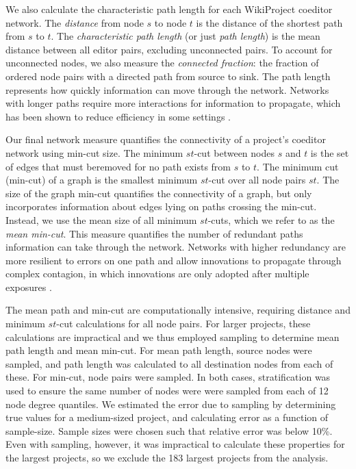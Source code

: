 We also calculate the characteristic path length for each WikiProject coeditor network.
The {\em distance} from node $s$ to node $t$ is the distance of the shortest path
from $s$ to $t$.
The {\em characteristic path length} (or just {\em path length})
is the mean distance between all editor pairs,
excluding unconnected pairs.
To account for unconnected nodes, we also measure the {\em connected fraction}:
the fraction of ordered node pairs with a directed path from source to sink.
The path length represents how quickly information can move through the network.
Networks with longer paths require more interactions for information to propagate,
which has been shown to reduce efficiency in some settings
\cite{mason_propagation_2008,barkoczi_social_2016}.

Our final network measure quantifies the connectivity of a project's coeditor
network using min-cut size.
The minimum $st$-cut between nodes $s$ and $t$ is the set of edges that must beremoved
for no path exists from $s$ to $t$.
The minimum cut (min-cut) of a graph is the smallest minimum $st$-cut over all node pairs $st$. 
The size of the graph min-cut quantifies the connectivity of a graph,
but only incorporates information about edges lying on paths crossing the min-cut.
Instead, we use the mean size of all minimum $st$-cuts, which we refer to as the
{\em mean min-cut}.
This measure quantifies the number of redundant paths information can take through the network.
Networks with higher redundancy are more resilient to errors on one path \cite{albert_error_2000}
and allow innovations to propagate through complex contagion,
in which innovations are only adopted after multiple exposures \cite{centola_complex_2007}.

The mean path and min-cut are computationally intensive,
requiring distance and minimum $st$-cut calculations for all node pairs.
For larger projects, these calculations are impractical and we thus employed
sampling to determine mean path length and mean min-cut.
For mean path length, source nodes were sampled, and path length was calculated to all destination nodes
from each of these.
For min-cut, node pairs were sampled.
In both cases, stratification was used to ensure the same number of nodes were were sampled from each of
12 node degree quantiles.
We estimated the error due to sampling by determining true values for a medium-sized project,
and calculating error as a function of sample-size.
Sample sizes were chosen such that relative error was below 10\%.
Even with sampling, however, it was impractical to calculate these properties for the largest projects,
so we exclude the 183 largest projects from the analysis.


